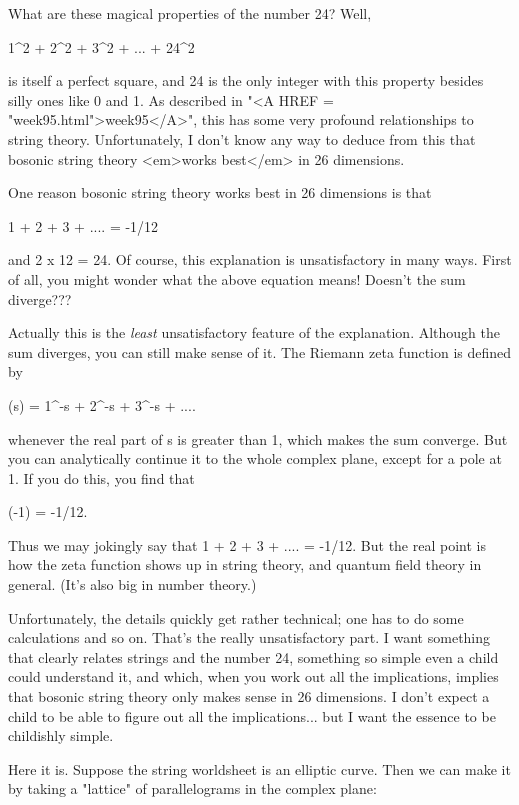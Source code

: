 What are these magical properties of the number 24?  Well,

                    1^{2} + 2^{2} + 3^{2} + ... + 24^{2}

is itself a perfect square, and 24 is the only integer with this
property besides silly ones like 0 and 1.  As described in "<A HREF = "week95.html">week95</A>", this
has some very profound relationships to string theory.  Unfortunately, I
don't know any way to deduce from this that bosonic string theory <em>works
best</em> in 26 dimensions.  

One reason bosonic string theory works best in 26 dimensions is that

                    1 + 2 + 3 + .... = -1/12

and 2 x 12 = 24.  Of course, this explanation is unsatisfactory in many 
ways.  First of all, you might wonder what the above equation means!   
Doesn't the sum diverge???

Actually this is the \emph{least} unsatisfactory feature of the explanation.
Although the sum diverges, you can still make sense of it.  The Riemann
zeta function is defined by

                \zeta (s) = 1^{-s} + 2^{-s} + 3^{-s} + ....

whenever the real part of s is greater than 1, which makes the sum
converge. But you can analytically continue it to the whole complex
plane, except for a pole at 1.  If you do this, you find that 

                       \zeta (-1) = -1/12.  

Thus we may jokingly say that 1 + 2 + 3 + .... = -1/12.  But the
real point is how the zeta function shows up in string theory, and
quantum field theory in general.  (It's also big in number theory.)

Unfortunately, the details quickly get rather technical; one has to do
some calculations and so on.  That's the really unsatisfactory part. I
want something that clearly relates strings and the number 24, something
so simple even a child could understand it, and which, when you work out
all the implications, implies that bosonic string theory only makes
sense in 26 dimensions.   I don't expect a child to be able to figure
out all the implications... but I want the essence to be childishly
simple.

Here it is.  Suppose the string worldsheet is an elliptic curve.  Then we
can make it by taking a "lattice" of parallelograms in the complex plane:
                 

